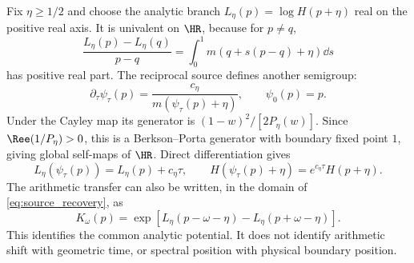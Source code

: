 Fix $\eta\ge1/2$ and choose the analytic branch
$L_\eta(p)=\log H(p+\eta)$ real on the positive real axis. It is
univalent on $\HR$, because for $p\ne q$,
\begin{equation}
 \frac{L_\eta(p)-L_\eta(q)}{p-q}
 =\int_0^1m(q+s(p-q)+\eta)\dd s
\end{equation}
has positive real part. The reciprocal source defines another semigroup:
\begin{equation}
 \partial_\tau\psi_\tau(p)=
 \frac{c_\eta}{m(\psi_\tau(p)+\eta)},\qquad \psi_0(p)=p.
 \label{eq:koenigs_flow}
\end{equation}
Under the Cayley map its generator is
$(1-w)^2/[2P_\eta(w)]$. Since $\Ree(1/P_\eta)>0$, this is a
Berkson--Porta generator with boundary fixed point $1$, giving global
self-maps of $\HR$. Direct differentiation gives
\begin{equation}
 \boxed{L_\eta(\psi_\tau(p))=L_\eta(p)+c_\eta\tau,\qquad
 H(\psi_\tau(p)+\eta)=e^{c_\eta\tau}H(p+\eta).}
 \label{eq:linearization}
\end{equation}
The arithmetic transfer can also be written, in the domain of
\eqref{eq:source_recovery}, as
\begin{equation}
 K_\omega(p)=\exp\left[
 L_\eta(p-\omega-\eta)-L_\eta(p+\omega-\eta)\right].
\end{equation}
This identifies the common analytic potential. It does not identify
arithmetic shift with geometric time, or spectral position with physical
boundary position.
